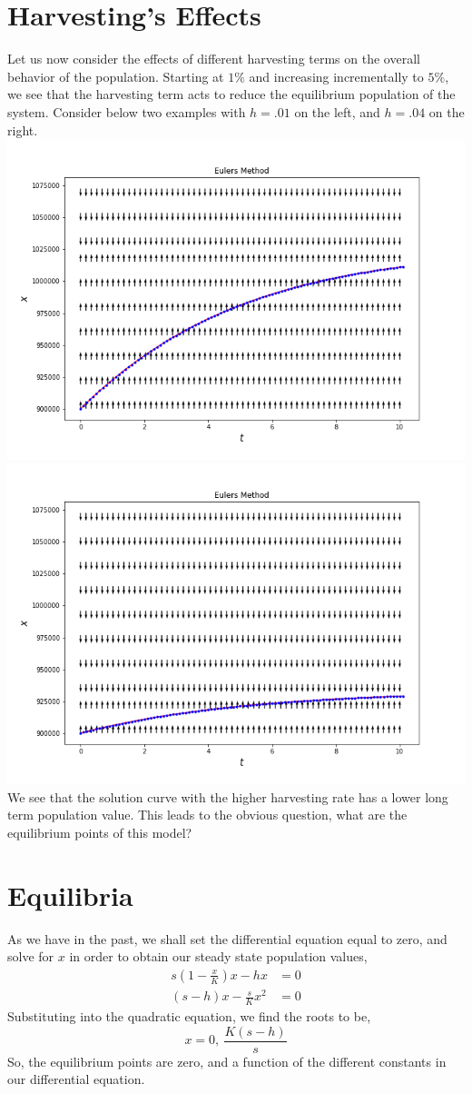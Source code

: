 \documentclass[letterpaper,12pt]{article}
\begin{document}
\section{Harvesting's Effects}
Let us now consider the effects of different harvesting terms on the overall behavior of the population. Starting at $1\%$ and increasing incrementally to $5\%$, we see that the harvesting term acts to reduce the equilibrium population of the system. Consider below two examples with $h=.01$ on the left, and $h=.04$ on the right.\\
\includegraphics[scale=.4]{3a1.png}
\includegraphics[scale=.4]{3a4.png}
We see that the solution curve with the higher harvesting rate has a lower long term population value. This leads to the obvious question, what are the equilibrium points of this model?
\section{Equilibria}
As we have in the past, we shall set the differential equation equal to zero, and solve for $x$ in order to obtain our steady state population values,
\begin{align*}
s(1-\frac{x}{K})x-hx &= 0\\
(s-h)x-\frac{s}{K}x^2 &= 0
\end{align*}
Substituting into the quadratic equation, we find the roots to be,
\[x=0,\ \frac{K(s-h)}{s}\]
So, the equilibrium points are zero, and a function of the different constants in our differential equation. 
\end{document}
